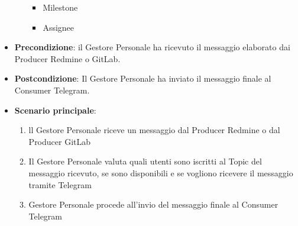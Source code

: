 \begin{itemize}
\begin{itemize}
\begin{itemize}
				\item Milestone
				\item Assignee
			\end{itemize}
		\end{itemize}
		\item \textbf{Precondizione}: il Gestore Personale ha ricevuto il messaggio elaborato dai Producer Redmine o GitLab.
		\item \textbf{Postcondizione}: Il Gestore Personale ha inviato il messaggio finale al Consumer Telegram.
		\item \textbf{Scenario principale}: 
		\begin{enumerate}
			\item ll Gestore Personale riceve un messaggio dal Producer Redmine o dal Producer GitLab
			\item Il Gestore Personale valuta quali utenti sono iscritti al Topic del messaggio ricevuto, se sono disponibili e se vogliono ricevere il messaggio tramite Telegram
			\item Gestore Personale procede all'invio del messaggio finale al Consumer Telegram
		\end{enumerate}
		
	\end{itemize}